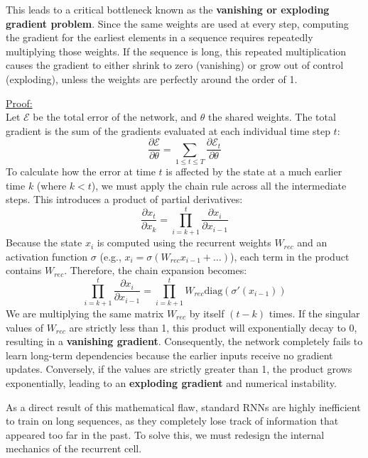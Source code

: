 This leads to a critical bottleneck known as the \textbf{vanishing or exploding gradient problem}. Since the same weights are used at every step, computing the gradient for the earliest elements in a sequence requires repeatedly multiplying those weights. If the sequence is long, this repeated multiplication causes the gradient to either shrink to zero (vanishing) or grow out of control (exploding), unless the weights are perfectly around the order of 1.

{ \small
\underline{Proof:} \\
Let $\mathcal{E}$ be the total error of the network, and $\theta$ the shared weights. The total gradient is the sum of the gradients evaluated at each individual time step $t$:
\begin{equation}
    \frac{\partial \mathcal{E}}{\partial \theta} = \sum_{1 \le t \le T} \frac{\partial \mathcal{E}_t}{\partial \theta}
\end{equation}
To calculate how the error at time $t$ is affected by the state at a much earlier time $k$ (where $k < t$), we must apply the chain rule across all the intermediate steps. This introduces a product of partial derivatives:
\begin{equation}
    \frac{\partial x_t}{\partial x_k} = \prod_{i=k+1}^t \frac{\partial x_i}{\partial x_{i-1}} 
\end{equation}
Because the state $x_i$ is computed using the recurrent weights $W_{rec}$ and an activation function $\sigma$ (e.g., $x_i = \sigma(W_{rec} x_{i-1} + \dots)$), each term in the product contains $W_{rec}$. Therefore, the chain expansion becomes:
\begin{equation}
    \prod_{i=k+1}^t \frac{\partial x_i}{\partial x_{i-1}} = \prod_{i=k+1}^t W_{rec} \text{diag}(\sigma'(x_{i-1}))
\end{equation}
We are multiplying the same matrix $W_{rec}$ by itself $(t-k)$ times. If the singular values of $W_{rec}$ are strictly less than 1, this product will exponentially decay to 0, resulting in a \textbf{vanishing gradient}. Consequently, the network completely fails to learn long-term dependencies because the earlier inputs receive no gradient updates. Conversely, if the values are strictly greater than 1, the product grows exponentially, leading to an \textbf{exploding gradient} and numerical instability.
}

As a direct result of this mathematical flaw, standard RNNs are highly inefficient to train on long sequences, as they completely lose track of information that appeared too far in the past. To solve this, we must redesign the internal mechanics of the recurrent cell.

